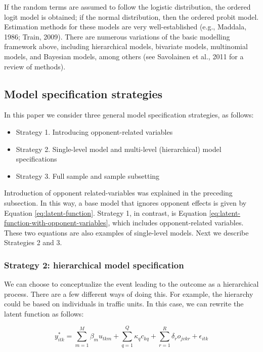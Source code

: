 \documentclass[]{elsarticle} %
\providecommand{\tightlist}{%
  \setlength{\itemsep}{0pt}\setlength{\parskip}{0pt}}
\begin{document}
If the random terms are assumed to follow the logistic distribution, the
ordered logit model is obtained; if the normal distribution, then the
ordered probit model. Estimation methods for these models are very
well-established (e.g., Maddala, 1986; Train, 2009). There are numerous
variations of the basic modelling framework above, including
hierarchical models, bivariate models, multinomial models, and Bayesian
models, among others (see Savolainen et al., 2011 for a review of
methods).

\hypertarget{sec:strategies}{%
\subsection{Model specification strategies}\label{sec:strategies}}

In this paper we consider three general model specification strategies,
as follows:

\begin{itemize}
\tightlist
\item
  Strategy 1. Introducing opponent-related variables
\item
  Strategy 2. Single-level model and multi-level (hierarchical) model
  specifications
\item
  Strategy 3. Full sample and sample subsetting
\end{itemize}

Introduction of opponent related-variables was explained in the
preceding subsection. In this way, a base model that ignores opponent
effects is given by Equation \ref{eq:latent-function}. Strategy 1, in
contrast, is Equation \ref{eq:latent-function-with-opponent-variables},
which includes opponent-related variables. These two equations are also
examples of single-level models. Next we describe Strategies 2 and 3.

\hypertarget{strategy-2-hierarchical-model-specification}{%
\subsubsection{Strategy 2: hierarchical model
specification}\label{strategy-2-hierarchical-model-specification}}

We can choose to conceptualize the event leading to the outcome as a
hierarchical process. There are a few different ways of doing this. For
example, the hierarchy could be based on individuals in traffic units.
In this case, we can rewrite the latent function as follows:

\begin{equation}
\label{eq:latent-function-with-hierarchical-traffic-unit}
y_{itk}^*=\sum_{m=1}^M\beta_mu_{tkm} + \sum_{q=1}^Q\kappa_qc_{kq} + \sum_{r=1}^R\delta_ro_{jvkr} + \epsilon_{itk}
\end{equation}
\end{document}
